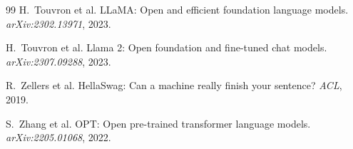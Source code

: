 \documentclass[11pt,a4paper]{article}
\begin{document}
\begin{thebibliography}{99}
H.~Touvron et al.
\newblock LLaMA: Open and efficient foundation language models.
\newblock \emph{arXiv:2302.13971}, 2023.

H.~Touvron et al.
\newblock Llama 2: Open foundation and fine-tuned chat models.
\newblock \emph{arXiv:2307.09288}, 2023.

R.~Zellers et al.
\newblock HellaSwag: Can a machine really finish your sentence?
\newblock \emph{ACL}, 2019.

S.~Zhang et al.
\newblock OPT: Open pre-trained transformer language models.
\newblock \emph{arXiv:2205.01068}, 2022.

\end{thebibliography}
\end{document}
